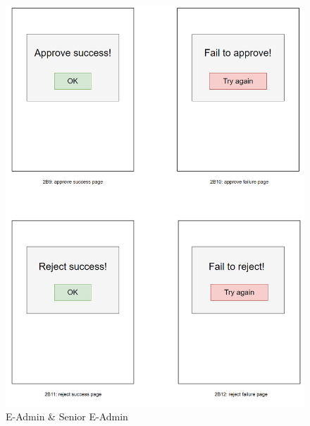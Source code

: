 \documentclass[a4paper,12pt]{article}
\begin{document}
\begin{figure}[H]
    \begin{center}
        \includegraphics[width=\textwidth]{picture/3439849.png}
        \caption{E-Admin \& Senior E-Admin}
        \label{fig:access-thesis}
    \end{center}
\end{figure}
\end{document}
